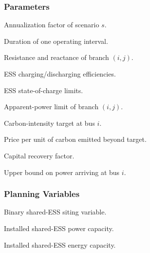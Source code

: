 \documentclass[journal]{IEEEtran}
\begin{document}
\subsubsection*{Parameters}
\begin{IEEEdescription}
\item[$\rho_s$] Annualization factor of scenario $s$.
\item[$\Delta t$] Duration of one operating interval.
\item[$r_{ij},x_{ij}$] Resistance and reactance of branch $(i,j)$.
\item[$\eta_i^{\mathrm{ch}},\eta_i^{\mathrm{dc}}$] ESS charging/discharging efficiencies.
\item[$\underline{\mathrm{SOC}}_i,\overline{\mathrm{SOC}}_i$] ESS state-of-charge limits.
\item[$\overline{S}_{ij}$] Apparent-power limit of branch $(i,j)$.
\item[$\overline{\mathscr{w}}_i$] Carbon-intensity target at bus $i$.
\item[$c^{\mathrm{CO_2}}$] Price per unit of carbon emitted beyond target.
\item[$\mathrm{CRF}$] Capital recovery factor.
\item[$\overline{A}_i$] Upper bound on power arriving at bus $i$.
\end{IEEEdescription}

\subsubsection*{Planning Variables}
\begin{IEEEdescription}
\item[$u_i^{\mathrm{es}}$] Binary shared-ESS siting variable.
\item[$P_i^{\mathrm{es,cap}}$] Installed shared-ESS power capacity.
\item[$E_i^{\mathrm{es,cap}}$] Installed shared-ESS energy capacity.
\end{IEEEdescription}
\end{document}
